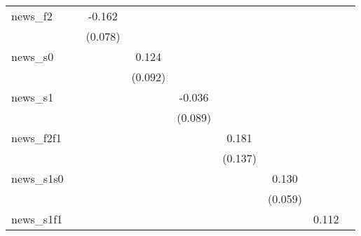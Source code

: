 {\begin{tabular}{l*{8}{c}}
news\_f2     &                     &      -0.162\sym{**} &                     &                     &                     &                     &                     &                     \\
            &                     &     (0.078)         &                     &                     &                     &                     &                     &                     \\
\addlinespace
news\_s0     &                     &                     &       0.124         &                     &                     &                     &                     &                     \\
            &                     &                     &     (0.092)         &                     &                     &                     &                     &                     \\
\addlinespace
news\_s1     &                     &                     &                     &      -0.036         &                     &                     &                     &                     \\
            &                     &                     &                     &     (0.089)         &                     &                     &                     &                     \\
\addlinespace
news\_f2f1   &                     &                     &                     &                     &       0.181         &                     &                     &                     \\
            &                     &                     &                     &                     &     (0.137)         &                     &                     &                     \\
\addlinespace
news\_s1s0   &                     &                     &                     &                     &                     &       0.130\sym{**} &                     &                     \\
            &                     &                     &                     &                     &                     &     (0.059)         &                     &                     \\
\addlinespace
news\_s1f1   &                     &                     &                     &                     &                     &                     &       0.112         &                     \\

\end{tabular}}
